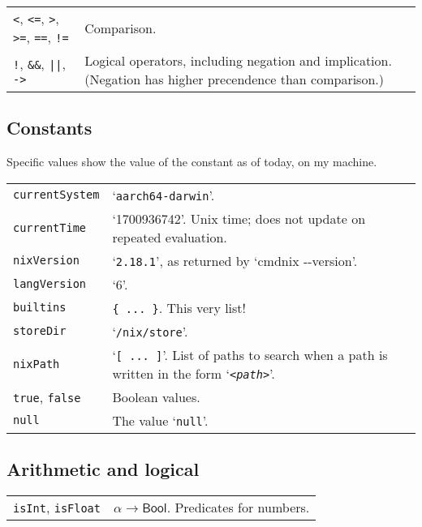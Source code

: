 \documentclass[9pt, a4paper, landscape]{extarticle}
\newcommand{\cmd}[1]{\texttt{#1}}
\newcommand{\bln}{\textsf{Bool}}
\begin{document}
\begin{multicols*}{3}
\begin{tabularx}{\columnwidth}{@{}l>{\raggedright\arraybackslash}X@{}}
  \cmd{<}, \cmd{<=}, \cmd{>}, \cmd{>=}, \cmd{==}, \cmd{!=} &
  Comparison. \\

  \cmd{!}, \cmd{\&\&}, \cmd{||}, \cmd{->} & Logical operators,
  including negation and implication. (Negation has higher precendence
  than comparison.) \\
\end{tabularx}


\columnbreak
\subsection*{Constants}
Specific values show the value of the constant as of today, on my
machine.

\begin{tabularx}{\columnwidth}{@{}l>{\raggedright\arraybackslash}X@{}}
  \cmd{currentSystem} & `\cmd{aarch64-darwin}'. \\
  \cmd{currentTime} & `1700936742'. Unix time; does not update on repeated
  evaluation. \\
  \cmd{nixVersion} & `\cmd{2.18.1}', as returned by `cmd{nix -{}-version}'. \\
  \cmd{langVersion} & `6'. \\
  \cmd{builtins} & \cmd{\{\ ...\ \}}. This very list! \\
  \cmd{storeDir} & `\cmd{/nix/store}'. \\
  \cmd{nixPath} & `\cmd{[\ ...\ ]}'. List of paths to search when a path is
  written in the form `\cmd{<\emph{path}>}'.  \\
  \cmd{true}, \cmd{false} & Boolean values. \\
  \cmd{null} & The value `\cmd{null}'. \\
\end{tabularx}


\subsection*{Arithmetic and logical}

\begin{tabularx}{\columnwidth}{@{}l>{\raggedright\arraybackslash}X@{}}
  \cmd{isInt}, \cmd{isFloat} & $\alpha\to\bln$. Predicates for numbers. \\


\end{tabularx}
\end{multicols*}
\end{document}
